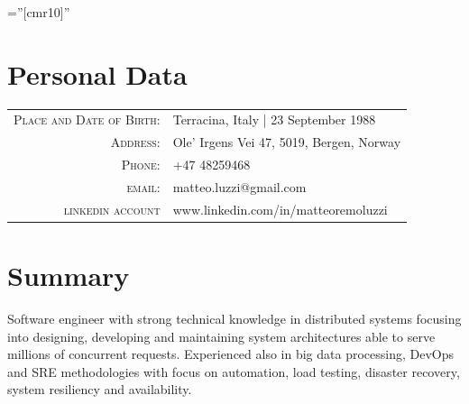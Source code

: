 \documentclass[a4paper,10pt]{article} %
\begin{document}
\pagestyle{empty} %

\font\fb=''[cmr10]'' %


\par{\bigskip\par} %

\section{Personal Data}

\begin{tabular}{rl}
\textsc{Place and Date of Birth:} & Terracina, Italy  | 23 September 1988 \\
\textsc{Address:} & Ole' Irgens Vei 47, 5019, Bergen, Norway \\
\textsc{Phone:} & +47 48259468\\
\textsc{email:} & {matteo.luzzi@gmail.com}\\
\textsc{linkedin account} & {www.linkedin.com/in/matteoremoluzzi} \\
\end{tabular}


\section{Summary}

\textsc Software engineer with strong technical knowledge in distributed systems
focusing into designing, developing and maintaining system architectures
able to serve millions of concurrent requests. Experienced also in big data
processing, DevOps and SRE methodologies with focus on automation,
load testing, disaster recovery, system resiliency and availability. \\


\end{document}
